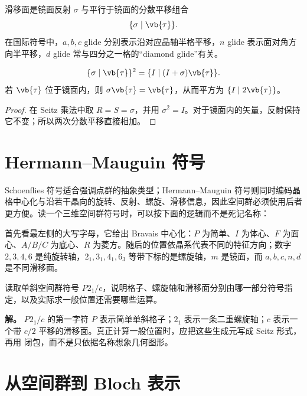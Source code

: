 \begin{definition}[滑移面]
滑移面是镜面反射 $\sigma$ 与平行于镜面的分数平移组合
\[
\{\sigma\mid\vb{\tau}\}.
\]
在国际符号中，$a,b,c$ glide 分别表示沿对应晶轴半格平移，$n$ glide 表示面对角方向半平移，$d$ glide 常与四分之一格的“diamond glide”有关。
\end{definition}
\begin{proposition}[滑移操作的平方]
\[
\{\sigma\mid\vb{\tau}\}^2
=\{I\mid (I+\sigma)\vb{\tau}\}.
\]
若 $\vb{\tau}$ 位于镜面内，则 $\sigma\vb{\tau}=\vb{\tau}$，从而平方为 $\{I\mid2\vb{\tau}\}$。
\end{proposition}
\begin{proof}
在 Seitz 乘法中取 $R=S=\sigma$，并用 $\sigma^2=I$。对于镜面内的矢量，反射保持它不变；所以两次分数平移直接相加。
\end{proof}

\section{Hermann--Mauguin 符号}

Schoenflies 符号适合强调点群的抽象类型；Hermann--Mauguin 符号则同时编码晶格中心化与沿若干晶向的旋转、反射、螺旋、滑移信息，因此空间群必须使用后者更方便。读一个三维空间群符号时，可以按下面的逻辑而不是死记名称：

首先看最左侧的大写字母，它给出 Bravais 中心化：$P$ 为简单、$I$ 为体心、$F$ 为面心、$A/B/C$ 为底心、$R$ 为菱方。随后的位置依晶系代表不同的特征方向；数字 $2,3,4,6$ 是纯旋转轴，$2_1,3_1,4_1,6_3$ 等带下标的是螺旋轴，$m$ 是镜面，而 $a,b,c,n,d$ 是不同滑移面。

\begin{example}
读取单斜空间群符号 $P2_1/c$，说明格子、螺旋轴和滑移面分别由哪一部分符号指定，以及实际求一般位置还需要哪些运算。

\textbf{解。} $P2_1/c$ 的第一字符 $P$ 表示简单单斜格子；$2_1$ 表示一条二重螺旋轴；$c$ 表示一个带 $c/2$ 平移的滑移面。真正计算一般位置时，应把这些生成元写成 Seitz 形式，再用  闭包，而不是只依据名称想象几何图形。
\end{example}

\section{从空间群到 Bloch 表示}

